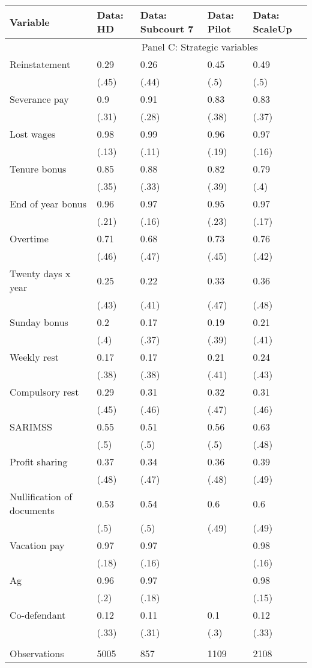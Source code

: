 \begin{tabular}{lllll}
\toprule
Variable & Data: HD & Data: Subcourt 7 & Data: Pilot & Data: ScaleUp \\
\midrule
\midrule
      & \multicolumn{4}{c}{Panel C: Strategic  variables} \\
\cmidrule{2-5}Reinstatement & 0.29  & 0.26  & 0.45  & 0.49 \\
      & (.45) & (.44) & (.5)  & (.5) \\
Severance pay & 0.9   & 0.91  & 0.83  & 0.83 \\
      & (.31) & (.28) & (.38) & (.37) \\
Lost wages & 0.98  & 0.99  & 0.96  & 0.97 \\
      & (.13) & (.11) & (.19) & (.16) \\
Tenure bonus & 0.85  & 0.88  & 0.82  & 0.79 \\
      & (.35) & (.33) & (.39) & (.4) \\
End of year bonus & 0.96  & 0.97  & 0.95  & 0.97 \\
      & (.21) & (.16) & (.23) & (.17) \\
Overtime & 0.71  & 0.68  & 0.73  & 0.76 \\
      & (.46) & (.47) & (.45) & (.42) \\
Twenty days x year & 0.25  & 0.22  & 0.33  & 0.36 \\
      & (.43) & (.41) & (.47) & (.48) \\
Sunday bonus & 0.2   & 0.17  & 0.19  & 0.21 \\
      & (.4)  & (.37) & (.39) & (.41) \\
Weekly rest & 0.17  & 0.17  & 0.21  & 0.24 \\
      & (.38) & (.38) & (.41) & (.43) \\
Compulsory rest & 0.29  & 0.31  & 0.32  & 0.31 \\
      & (.45) & (.46) & (.47) & (.46) \\
SARIMSS & 0.55  & 0.51  & 0.56  & 0.63 \\
      & (.5)  & (.5)  & (.5)  & (.48) \\
Profit sharing & 0.37  & 0.34  & 0.36  & 0.39 \\
      & (.48) & (.47) & (.48) & (.49) \\
Nullification of documents & 0.53  & 0.54  & 0.6   & 0.6 \\
      & (.5)  & (.5)  & (.49) & (.49) \\
Vacation pay & 0.97  & 0.97  &       & 0.98 \\
      & (.18) & (.16) &       & (.16) \\
Ag    & 0.96  & 0.97  &       & 0.98 \\
      & (.2)  & (.18) &       & (.15) \\
Co-defendant & 0.12  & 0.11  & 0.1   & 0.12 \\
      & (.33) & (.31) & (.3)  & (.33) \\
\midrule
\midrule
      &       &       &       &  \\
Observations & 5005  & 857   & 1109  & 2108 \\
\bottomrule
\end{tabular}%
